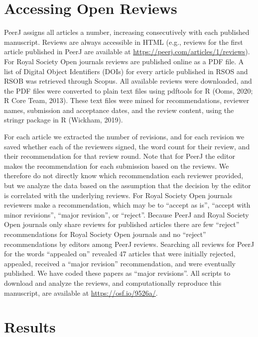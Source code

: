 \documentclass[
  english,
  ,jou, a4paper,floatsintext]{apa6}
\begin{document}
\hypertarget{accessing-open-reviews}{%
\section{Accessing Open Reviews}\label{accessing-open-reviews}}

PeerJ assigns all articles a number, increasing consecutively with each published manuscript. Reviews are always accessible in HTML (e.g., reviews for the first article published in PeerJ are available at \url{https://peerj.com/articles/1/reviews}). For Royal Society Open journals reviews are published online as a PDF file. A list of Digital Object Identifiers (DOIs) for every article published in RSOS and RSOB was retrieved through Scopus. All available reviews were downloaded, and the PDF files were converted to plain text files using pdftools for R (Ooms, 2020; R Core Team, 2013). These text files were mined for recommendations, reviewer names, submission and acceptance dates, and the review content, using the stringr package in R (Wickham, 2019).

For each article we extracted the number of revisions, and for each revision we saved whether each of the reviewers signed, the word count for their review, and their recommendation for that review round. Note that for PeerJ the editor makes the recommendation for each submission based on the reviews. We therefore do not directly know which recommendation each reviewer provided, but we analyze the data based on the assumption that the decision by the editor is correlated with the underlying reviews. For Royal Society Open journals reviewers make a recommendation, which may be to \enquote{accept as is}, \enquote{accept with minor revisions}, \enquote{major revision}, or \enquote{reject}. Because PeerJ and Royal Society Open journals only share reviews for published articles there are few \enquote{reject} recommendations for Royal Society Open journals and no \enquote{reject} recommendations by editors among PeerJ reviews. Searching all reviews for PeerJ for the words \enquote{appealed on} revealed 47 articles that were initially rejected, appealed, received a \enquote{major revision} recommendation, and were eventually published. We have coded these papers as \enquote{major revisions}. All scripts to download and analyze the reviews, and computationally reproduce this manuscript, are available at \url{https://osf.io/9526a/}.

\hypertarget{results}{%
\section{Results}\label{results}}
\end{document}
